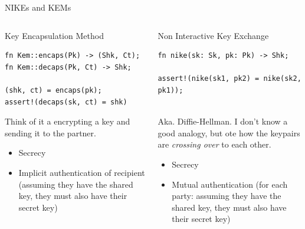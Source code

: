 \begin{frame}[fragile,t]{NIKEs and KEMs}
\hypertarget{nike-kem-2}{}
  \vspace{-1.5em}
  \begin{columns}[t]
    \begin{column}{.5\linewidth}
      \begin{block}{Key Encapsulation Method}

        \small
        \begin{verbatim}
fn Kem::encaps(Pk) -> (Shk, Ct);
fn Kem::decaps(Pk, Ct) -> Shk;

(shk, ct) = encaps(pk);
assert!(decaps(sk, ct) = shk)
        \end{verbatim}  
        \vspace{1em}
        Think of it a encrypting a key and sending it
        to the partner.

        \vspace{0.7em}
        \begin{itemize}
          \item Secrecy
          \item Implicit authentication of recipient
            (assuming they have the shared key, they must
            also have their secret key)
        \end{itemize}
      \end{block}
    \end{column}

    \begin{column}{.5\linewidth}
      \begin{block}{Non Interactive Key Exchange}
        \small
        \begin{verbatim}
fn nike(sk: Sk, pk: Pk) -> Shk;

assert!(nike(sk1, pk2) = nike(sk2, pk1));


        \end{verbatim}  

        \vspace{1em}
        Aka. Diffie-Hellman.
        I don't know a good analogy, but ote how the
        keypairs are \emph{crossing over} to each other.

        \vspace{0.7em}
        \begin{itemize}
          \item Secrecy
          \item Mutual authentication
            (for each party: assuming they have the shared key, they must
            also have their secret key)
        \end{itemize}
      \end{block}
    \end{column}

  \end{columns}
\end{frame}





